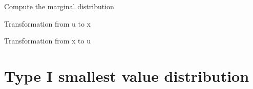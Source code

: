\documentclass[letterpaper,10pt,english]{sphinxmanual}
\begin{document}
\begin{fulllineitems}
\begin{fulllineitems}
Compute the marginal distribution

\end{fulllineitems}



\begin{fulllineitems}
Transformation from u to x

\end{fulllineitems}



\begin{fulllineitems}
Transformation from x to u

\end{fulllineitems}


\end{fulllineitems}



\section{Type I smallest value distribution}
\label{distributions:type-i-smallest-value-distribution}
\end{document}
